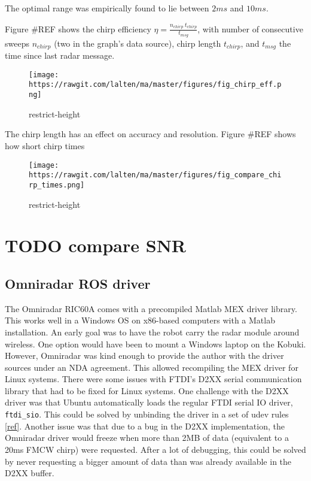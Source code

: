 The optimal range was empirically found to lie between \(2ms\) and
\(10ms\).

Figure \#REF shows the chirp efficiency
\(\eta = \frac{n_{chirp}~t_{chirp}}{t_{msg}}\), with number of
consecutive sweeps \(n_{chirp}\) (two in the graph's data source), chirp
length \(t_{chirp}\), and \(t_{msg}\) the time since last radar message.

\begin{figure}
\centering
\texttt{[image: https://rawgit.com/lalten/ma/master/figures/fig\_chirp\_eff.png]}
\caption{restrict-height}
\end{figure}

The chirp length has an effect on accuracy and resolution. Figure \#REF
shows how short chirp times

\begin{figure}
\centering
\texttt{[image: https://rawgit.com/lalten/ma/master/figures/fig\_compare\_chirp\_times.png]}
\caption{restrict-height}
\end{figure}

\section{TODO compare SNR}\label{todo-compare-snr}

\subsection{Omniradar ROS driver}\label{omniradar-ros-driver}

The Omniradar RIC60A comes with a precompiled Matlab MEX driver library.
This works well in a Windows OS on x86-based computers with a Matlab
installation. An early goal was to have the robot carry the radar module
around wireless. One option would have been to mount a Windows laptop on
the Kobuki. However, Omniradar was kind enough to provide the author
with the driver sources under an NDA agreement. This allowed recompiling
the MEX driver for Linux systems. There were some issues with FTDI's
D2XX serial communication library that had to be fixed for Linux
systems. One challenge with the D2XX driver was that Ubuntu
automatically loads the regular FTDI serial IO driver,
\texttt{ftdi\_sio}. This could be solved by unbinding the driver in a
set of udev rules
\href{https://stackoverflow.com/questions/44529376}{{[}ref{]}}. Another
issue was that due to a bug in the D2XX implementation, the Omniradar
driver would freeze when more than 2MB of data (equivalent to a 20ms
FMCW chirp) were requested. After a lot of debugging, this could be
solved by never requesting a bigger amount of data than was already
available in the D2XX buffer.

